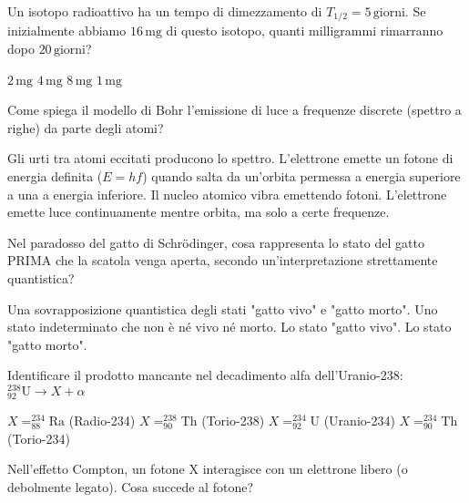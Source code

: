 \documentclass{exam}%
\begin{document}
\begin{questions}
\question Un isotopo radioattivo ha un tempo di dimezzamento di $T_{1/2} = 5 \, \text{giorni}$. Se inizialmente abbiamo $16 \, \text{mg}$ di questo isotopo, quanti milligrammi rimarranno dopo $20 \, \text{giorni}$?%
\vspace{0.2em}%
\begin{multicols}{4}%
\begin{choices}%
\choice $2 \, \text{mg}$%
\choice $4 \, \text{mg}$%
\choice $8 \, \text{mg}$%
\choice $1 \, \text{mg}$%
\end{choices}%
\end{multicols}%
\question Come spiega il modello di Bohr l'emissione di luce a frequenze discrete (spettro a righe) da parte degli atomi?%
\vspace{0.2em}%
\begin{choices}%
\choice Gli urti tra atomi eccitati producono lo spettro.%
\choice L'elettrone emette un fotone di energia definita ($E = hf$) quando salta da un'orbita permessa a energia superiore a una a energia inferiore.%
\choice Il nucleo atomico vibra emettendo fotoni.%
\choice L'elettrone emette luce continuamente mentre orbita, ma solo a certe frequenze.%
\end{choices}%
\question Nel paradosso del gatto di Schrödinger, cosa rappresenta lo stato del gatto PRIMA che la scatola venga aperta, secondo un'interpretazione strettamente quantistica?%
\vspace{0.2em}%
\begin{choices}%
\choice Una sovrapposizione quantistica degli stati "gatto vivo" e "gatto morto".%
\choice Uno stato indeterminato che non è né vivo né morto.%
\choice Lo stato "gatto vivo".%
\choice Lo stato "gatto morto".%
\end{choices}%
\question Identificare il prodotto mancante nel decadimento alfa dell'Uranio-238: $^{238}_{92}\text{U} \rightarrow X + \alpha$%
\vspace{0.2em}%
\begin{multicols}{4}%
\begin{choices}%
\choice $X = ^{234}_{88}\text{Ra}$ (Radio-234)%
\choice $X = ^{238}_{90}\text{Th}$ (Torio-238)%
\choice $X = ^{234}_{92}\text{U}$ (Uranio-234)%
\choice $X = ^{234}_{90}\text{Th}$ (Torio-234)%
\end{choices}%
\end{multicols}%
\question Nell'effetto Compton, un fotone X interagisce con un elettrone libero (o debolmente legato). Cosa succede al fotone?%
\vspace{0.2em}%
\begin{choices}%

\end{choices}
\end{questions}
\end{document}
